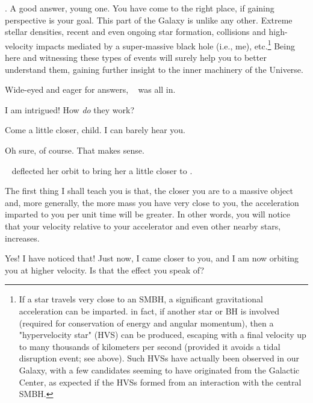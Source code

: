 \documentclass[main.tex]{subfiles}
\begin{document}
\par \Chiron.  A good answer, young one.  You have come to the right place, if gaining perspective is your goal.  This part of the Galaxy is unlike any other.  Extreme stellar densities, recent and even ongoing star formation, collisions and high-velocity impacts mediated by a super-massive black hole (i.e., me), etc.\footnote{If a star travels very close to an SMBH, a significant gravitational acceleration can be imparted.  in fact, if another star or BH is involved (required for conservation of energy and angular momentum), then a "hypervelocity star" (HVS) can be produced, escaping with a final velocity up to many thousands of kilometers per second (provided it avoids a tidal disruption event; see above).  Such HVSs have actually been observed in our Galaxy, with a few candidates seeming to have originated from the Galactic Center, as expected if the HVSs formed from an interaction with the central SMBH.}  Being here and witnessing these types of events will surely help you to better understand them, gaining further insight to the inner machinery of the Universe.

\par \nar Wide-eyed and eager for answers, \rmelectra~ was all in.

\par \Electra I am intrigued!  How \textit{do} they work?

\par \Chiron Come a little closer, child.  I can barely hear you.

\par \Electra Oh sure, of course.  That makes sense.

\par \nar \rmelectra~ deflected her orbit to bring her a little closer to \rmchiron.

\par \Chiron The first thing I shall teach you is that, the closer you are to a massive object and, more generally, the more mass you have very close to you, the acceleration imparted to you per unit time will be greater.  In other words, you will notice that your velocity relative to your accelerator and even other nearby stars, increases.

\par \Electra Yes!  I have noticed that!  Just now, I came closer to you, and I am now orbiting you at higher velocity.  Is that the effect you speak of?
\end{document}
